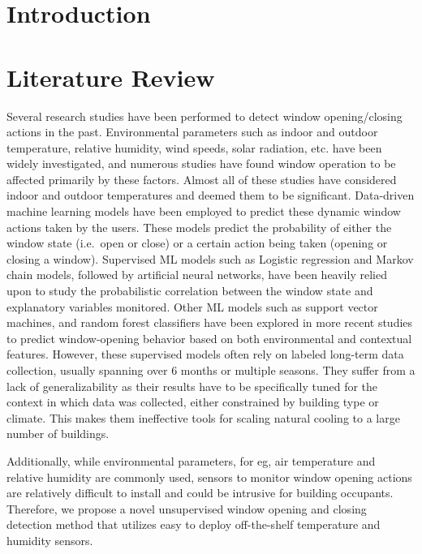 \documentclass[sigconf]{acmart}
\begin{document}
\hypertarget{introduction}{%
\section{Introduction}\label{introduction}}

\hypertarget{literature-review}{%
\section{Literature Review}\label{literature-review}}

Several research studies have been performed to detect window
opening/closing actions in the past. Environmental parameters such as
indoor and outdoor temperature, relative humidity, wind speeds, solar
radiation, etc. have been widely investigated, and numerous studies have
found window operation to be affected primarily by these factors. Almost
all of these studies have considered indoor and outdoor temperatures and
deemed them to be significant. Data-driven machine learning models have
been employed to predict these dynamic window actions taken by the
users. These models predict the probability of either the window state
(i.e.~open or close) or a certain action being taken (opening or closing
a window). Supervised ML models such as Logistic regression and Markov
chain models, followed by artificial neural networks, have been heavily
relied upon to study the probabilistic correlation between the window
state and explanatory variables monitored. Other ML models such as
support vector machines, and random forest classifiers have been
explored in more recent studies to predict window-opening behavior based
on both environmental and contextual features. However, these supervised
models often rely on labeled long-term data collection, usually spanning
over 6 months or multiple seasons. They suffer from a lack of
generalizability as their results have to be specifically tuned for the
context in which data was collected, either constrained by building type
or climate. This makes them ineffective tools for scaling natural
cooling to a large number of buildings.

Additionally, while environmental parameters, for eg, air temperature
and relative humidity are commonly used, sensors to monitor window
opening actions are relatively difficult to install and could be
intrusive for building occupants. Therefore, we propose a novel
unsupervised window opening and closing detection method that utilizes
easy to deploy off-the-shelf temperature and humidity sensors.
\end{document}
